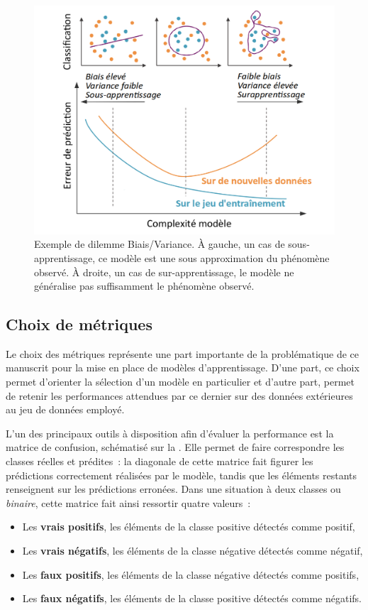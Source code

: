 \begin{figure}[H]
    \centering
    \includegraphics[width=0.8\linewidth]{contents/chapter_3/resources/example_underfit_overfit.pdf}
    \caption{Exemple de dilemme Biais/Variance. À gauche, un cas de sous-apprentissage, ce modèle est une sous approximation du phénomène observé. À droite, un cas de sur-apprentissage, le modèle ne généralise pas suffisamment le phénomène observé.}
    \label{fig:example_underfit_overfit}
\end{figure}

\subsection{Choix de métriques}
\label{subsec:metrics}
Le choix des métriques représente une part importante de la problématique de ce manuscrit pour la mise en place de modèles d’apprentissage. D'une part, ce choix permet d'orienter la sélection d'un modèle en particulier et d'autre part, permet de retenir les performances attendues par ce dernier sur des données extérieures au jeu de données employé.\par

L’un des principaux outils à disposition afin d'évaluer la performance est la matrice de confusion, schématisé sur la . Elle permet de faire correspondre les classes réelles et prédites~: la diagonale de cette matrice fait figurer les prédictions correctement réalisées par le modèle, tandis que les éléments restants renseignent sur les prédictions erronées. Dans une situation à deux classes ou \textit{binaire}, cette matrice fait ainsi ressortir quatre valeurs~:
\begin{itemize}
	\item Les \textbf{vrais positifs}, les éléments de la classe positive détectés comme positif,
	\item Les \textbf{vrais négatifs}, les éléments de la classe négative détectés comme négatif,
	\item Les \textbf{faux positifs}, les éléments de la classe négative détectés comme positifs,
	\item Les \textbf{faux négatifs}, les éléments de la classe positive détectés comme négatifs.
\end{itemize}\par


